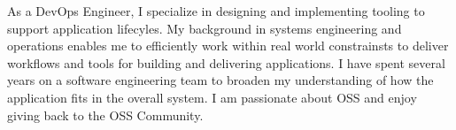 

\begin{cvparagraph}

As a DevOps Engineer,  I specialize in designing and implementing tooling to support application lifecyles.  
My background in systems engineering and operations enables me to efficiently work within real world constrainsts to deliver workflows and tools for building and delivering applications.
I have spent several years on a software engineering team to broaden my understanding of how the application fits in the overall system.
I am passionate about OSS and enjoy giving back to the OSS Community.
\end{cvparagraph}
